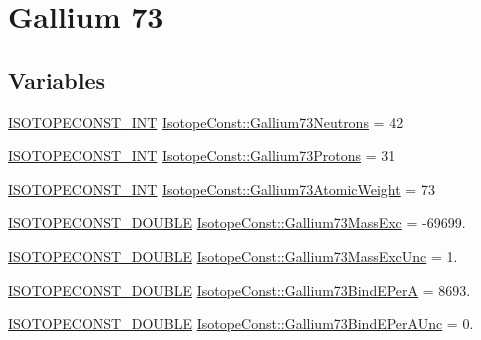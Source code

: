 \hypertarget{group___isotope_const-_gallium-_ga73}{}\section{Gallium 73}
\label{group___isotope_const-_gallium-_ga73}
\subsection*{Variables}
\begin{DoxyCompactItemize}
\item 
\mbox{\hyperlink{group___isotope_const-_macros_ga5f18360b3e99483a35c32d789e62621c}{I\+S\+O\+T\+O\+P\+E\+C\+O\+N\+S\+T\+\_\+\+I\+NT}} \mbox{\hyperlink{group___isotope_const-_gallium-_ga73_gaedd3b42f5e5d8917a6c8094e7d8ddd66}{Isotope\+Const\+::\+Gallium73\+Neutrons}} = 42
\item 
\mbox{\hyperlink{group___isotope_const-_macros_ga5f18360b3e99483a35c32d789e62621c}{I\+S\+O\+T\+O\+P\+E\+C\+O\+N\+S\+T\+\_\+\+I\+NT}} \mbox{\hyperlink{group___isotope_const-_gallium-_ga73_ga7d4b3cff4bc2603a0457499358517fd6}{Isotope\+Const\+::\+Gallium73\+Protons}} = 31
\item 
\mbox{\hyperlink{group___isotope_const-_macros_ga5f18360b3e99483a35c32d789e62621c}{I\+S\+O\+T\+O\+P\+E\+C\+O\+N\+S\+T\+\_\+\+I\+NT}} \mbox{\hyperlink{group___isotope_const-_gallium-_ga73_gaae50458d0f11451b0e59b26bcc07fb93}{Isotope\+Const\+::\+Gallium73\+Atomic\+Weight}} = 73
\item 
\mbox{\hyperlink{group___isotope_const-_macros_ga8f45a7272ce02c0b4c65c44636ed719a}{I\+S\+O\+T\+O\+P\+E\+C\+O\+N\+S\+T\+\_\+\+D\+O\+U\+B\+LE}} \mbox{\hyperlink{group___isotope_const-_gallium-_ga73_gaa679ec793bf2e24a43a4b0549f5a3177}{Isotope\+Const\+::\+Gallium73\+Mass\+Exc}} = -\/69699.
\item 
\mbox{\hyperlink{group___isotope_const-_macros_ga8f45a7272ce02c0b4c65c44636ed719a}{I\+S\+O\+T\+O\+P\+E\+C\+O\+N\+S\+T\+\_\+\+D\+O\+U\+B\+LE}} \mbox{\hyperlink{group___isotope_const-_gallium-_ga73_gaaccb317cbdf9cecd8838a6bfc8774b1d}{Isotope\+Const\+::\+Gallium73\+Mass\+Exc\+Unc}} = 1.
\item 
\mbox{\hyperlink{group___isotope_const-_macros_ga8f45a7272ce02c0b4c65c44636ed719a}{I\+S\+O\+T\+O\+P\+E\+C\+O\+N\+S\+T\+\_\+\+D\+O\+U\+B\+LE}} \mbox{\hyperlink{group___isotope_const-_gallium-_ga73_ga1bc485cec8f55faa101a0b7a524bb502}{Isotope\+Const\+::\+Gallium73\+Bind\+E\+PerA}} = 8693.
\item 
\mbox{\hyperlink{group___isotope_const-_macros_ga8f45a7272ce02c0b4c65c44636ed719a}{I\+S\+O\+T\+O\+P\+E\+C\+O\+N\+S\+T\+\_\+\+D\+O\+U\+B\+LE}} \mbox{\hyperlink{group___isotope_const-_gallium-_ga73_ga24dcf17f70446a004eb6e7bd44c8a81e}{Isotope\+Const\+::\+Gallium73\+Bind\+E\+Per\+A\+Unc}} = 0.

\end{DoxyCompactItemize}
